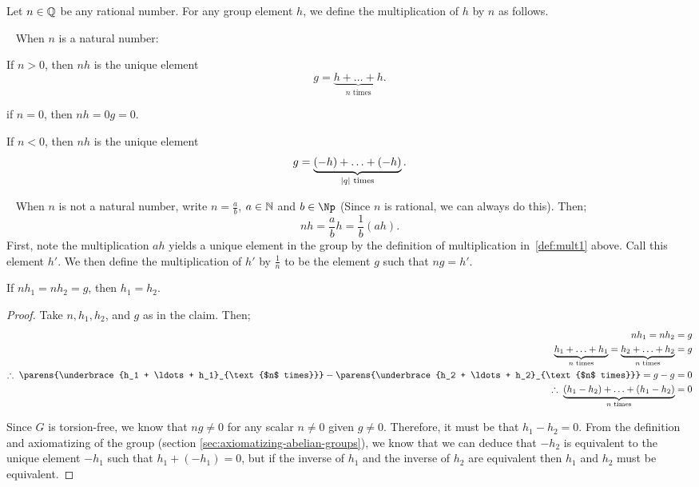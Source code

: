 Let $n \in \mathbb{Q}$ be any rational number.
For any group element $h$, we define the multiplication of $h$ by $n$
as follows.
\begin{enumarabic}
  \item~\label{def:mult1} When $n$ is a natural number:
    \begin{enumroman}
      \item If $n > 0$, then $nh$ is the unique element
        \[ g = \underbrace{h + \ldots + h}_{\text{$n$ times}}. \]
      \item if $n = 0$, then $nh = 0g = 0$.
      \item If $n < 0$, then $nh$ is the unique element
        \[ g = \underbrace{(-h) + \ldots + (-h)}_{\text{$\lvert q\rvert$ times}}. \]
    \end{enumroman}
  \item ~\label{def:mult2} When $n$ is not a natural number,
    write $n = \frac{a}{b}$, $a \in \mathbb{N}$ and $b \in \Np$
    (Since $n$ is rational, we can always do this).
    Then;
      \[ nh = \frac{a}{b} h = \frac{1}{b} (ah). \]
    First, note the multiplication $ah$ yields a unique element in the group
    by the definition of multiplication in~\ref{def:mult1} above.
    Call this element $h'$.
    We then define the multiplication of $h'$ by $\frac{1}{n}$ to be the
    element $g$ such that $ng = h'$.
    
    \begin{claim}
      If $nh_1 = nh_2 = g$, then $h_1 = h_2$.

      \begin{proof}
        Take $n, h_1, h_2$, and $g$ as in the claim.
        Then; 
        \begin{align*}
          nh_1 = nh_2 &= g \\
          \underbrace{h_1 + \ldots + h_1}_{\text{$n$ times}}
            = \underbrace{h_2 + \ldots + h_2}_{\text{$n$ times}} &= g \\
          \Therefore \parens{\underbrace{h_1 + \ldots + h_1}_{\text{$n$ times}}}
            - \parens{\underbrace{h_2 + \ldots + h_2}_{\text{$n$ times}}} = g - g &= 0 \\
          \Therefore \underbrace{(h_1 - h_2) + \ldots + (h_1 - h_2)}_{\text{$n$ times}} &= 0
        \end{align*}

        Since $G$ is torsion-free, we know that $ng \neq 0$ for any scalar
        $n \neq 0$ given $g \neq 0$.
        Therefore, it must be that $h_1 - h_2 = 0$.
        From the definition and axiomatizing of the group
        (section \ref{sec:axiomatizing-abelian-groups}),
        we know that we can deduce that $-h_2$ is equivalent to the unique element
        $-h_1$ such that $h_1 + (-h_1) = 0$,
        but if the inverse of $h_1$ and the inverse of $h_2$ are equivalent
        then $h_1$ and $h_2$ must be equivalent.

      \end{proof}
    \end{claim}

\end{enumarabic}

